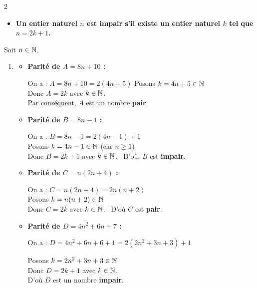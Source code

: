\documentclass[10pt, a4paper]{article}
\begin{document}
\begin{multicols*}{2}
\begin{Solution}[ACTIVITÉ][1]
\begin{enumerate}[leftmargin=*,itemsep=0.5pt]
    \begin{itemize}[label=$\blacktriangleright$, leftmargin=*, nosep]
    \item \textbf{Un entier naturel $n$ est \textcolor{PrimaryColor}{impair} s'il existe un entier naturel $k$ tel que $n = 2k+1$.}
\end{itemize}
\end{enumerate}
\end{Solution}

\begin{Solution}[APPLICATION][1]
Soit $n \in \mathbb{N}$.
\begin{enumerate}[leftmargin=*,itemsep=0.5pt]
    \item
    \begin{itemize}[leftmargin=*,itemsep=0.5pt]
        \item \textbf{Parité de $A = 8n + 10$ :}

    On a : $A = 8n + 10 = 2(4n + 5)$ \quad
    Posons $k = 4n + 5 \in \mathbb{N}$ \\
    Donc $A = 2k$ avec $k \in \mathbb{N}$. \\
    Par conséquent, $A$ est un nombre \textbf{pair}.

        \item \textbf{Parité de $B = 8n - 1$ :}

    On a : $B = 8n - 1 = 2(4n - 1) + 1$ \\
    Posons $k = 4n - 1 \in \mathbb{N}$ (car $n \geq 1$) \\
    Donc $B = 2k + 1$ avec $k \in \mathbb{N}$.~
    D'où, $B$ est \textbf{impair}.

        \item \textbf{Parité de $C = n(2n + 4)$ :}

    On a : $C = n(2n + 4) = 2n(n + 2)$ \\
    Posons $k = n(n + 2) \in \mathbb{N}$ \\
    Donc $C = 2k$ avec $k \in \mathbb{N}$.~ 
    D'où $C$ est \textbf{pair}.


        \item \textbf{Parité de $D = 4n^2 + 6n + 7$ :}

    On a :  $D = 4n^2 + 6n + 6 + 1  = 2(2n^2 + 3n + 3) + 1$

    Posons $k = 2n^2 + 3n + 3 \in \mathbb{N}$ \\
    Donc $D = 2k + 1$ avec $k \in \mathbb{N}$. \\
    D'où  $D$ est un nombre \textbf{impair}.
    \end{itemize}


\end{enumerate}
\end{Solution}
\end{multicols*}
\end{document}
